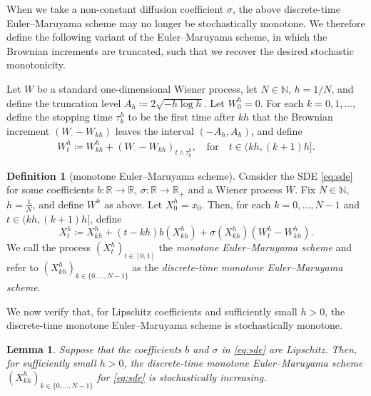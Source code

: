 \documentclass[oneside]{amsart}
\newtheorem{lemma}[theorem]{Lemma}
\theoremstyle{definition}
\newtheorem{definition}[theorem]{Definition}
\newcommand{\N}{\mathbb N}
\newcommand{\R}{\mathbb R}
\def\R{{\mathbb R}}
\numberwithin{equation}{section}
\begin{document}
When we take a non-constant diffusion coefficient $\sigma$, the above discrete-time Euler--Maruyama scheme may no longer be stochastically monotone. We therefore define the following variant of the Euler--Maruyama scheme, in which the Brownian increments are truncated, such that we recover the desired stochastic monotonicity.

Let $W$ be a standard one-dimensional Wiener process, let $N \in \N$, $h = 1/N$, and define the truncation level $A_h \coloneqq  2\sqrt{- h \log h}$. Let $W^h_0=0$. For each $k = 0, 1, \dotsc$, define the stopping time $\tau^h_k$ to be the first time after $kh$ that the Brownian increment $(W_\cdot - W_{kh})$ leaves the interval $(-A_h, A_h)$, and define \begin{align}
 			W^h_t\coloneqq  W^h_{kh} + (W_\cdot -W_{kh})_{t \wedge \tau^h_k}, \quad \text{for} \quad t \in (kh, (k + 1)h].
	\end{align}


\begin{definition}[monotone Euler--Maruyama scheme]\label{def:monotone-em}
	Consider the SDE \eqref{eq:sde} for some coefficients $b\colon \R \to \R$, $\sigma \colon \R \to \R_+$ and a Wiener process $W$. Fix $N \in \N$, $h = \frac{1}{N}$, and define $W^h$ as above.
	Let $X^h_0 = x_0$. Then, for each $k = 0, \dotsc, N - 1$ and $t \in (kh, (k + 1)h]$, define
\begin{equation}
	X^h_t\coloneqq  X^h_{kh} + (t - kh) b(X^h_{kh}) + \sigma(X^h_{kh}) (W^h_t - W^h_{kh}).
\end{equation}
We call the process $(X^h_t)_{t \in [0, 1]}$ the \emph{monotone Euler--Maruyama scheme} and refer to $(X^h_{kh})_{k \in \{0, \dotsc, N - 1\}}$ as the \emph{discrete-time monotone Euler--Maruyama scheme}.
\end{definition}

We now verify that, for Lipschitz coefficients and sufficiently small $h > 0$, the discrete-time monotone Euler--Maruyama scheme is stochastically monotone.

\begin{lemma}\label{lem:truncated-increasing-kernels}
	Suppose that the coefficients $b$ and $\sigma$ in \eqref{eq:sde} are Lipschitz. Then, for sufficiently small $h > 0$, the discrete-time monotone Euler--Maruyama scheme $(X^h_{kh})_{k \in \{0, \dotsc, N - 1\}}$ for \eqref{eq:sde} is stochastically increasing.
\end{lemma}
\end{document}

